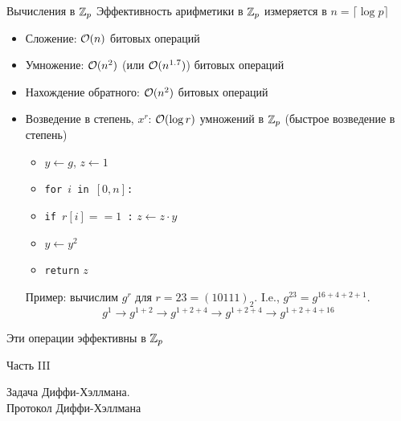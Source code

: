 \documentclass[usenames,dvipsnames,8pt,aspectratio=169]{beamer}
\begin{document}
\begin{frame}{Вычисления в ${{\mathbb Z}}_p$ }
\large
Эффективность арифметики в ${{\mathbb Z}}_p$ измеряется в $n = \lceil \log p \rceil$
\begin{itemize}
\itemsep 5pt
\item Сложение: $\mathcal{O}(n)$ битовых операций
\item Умножение: $\mathcal{O}(n^2)$ (или $\mathcal{O}(n^{1.7})$) битовых операций
\item Нахождение обратного: $\mathcal{O}(n^2)$ битовых операций
\pause
\item Возведение в степень, $x^r$:  $\mathcal{O}(\log r)$ умножений в ${{\mathbb Z}}_p$ (быстрое возведение в степень)\\
\begin{itemize}
\Large
\item $y \leftarrow g$, $z \leftarrow 1$
\item \texttt{for $i$ in $[0, n]$:}
\item \hspace{10pt}  \texttt{if $r[i]==1$ :} $z \leftarrow z \cdot y$
\item \hspace{10pt}  $y \leftarrow y^2$
\item \texttt{return} $z$
\end{itemize}
\pause 
Пример: вычислим $g^r$ для $r = 23 = (10111)_2$. I.e., $g^{23} = g^{16+4+2+1}$. \\
\[
g^1 \rightarrow g^{1+2} \rightarrow g^{1+2+4} \rightarrow  g^{1+2+4} \rightarrow g^{1+2+4+16} 
\]

\end{itemize}

\vspace{15pt}
\centering
\Large
Эти операции {\color{Orange} {эффективны}} в ${{\mathbb Z}}_p$
\end{frame}

\begin{frame}
Часть III \\ [10pt]
\begin{LARGE}
	
	\color{Orange}
	\Huge  Задача Диффи-Хэллмана. \\ Протокол Диффи-Хэллмана
	
\end{LARGE}
\end{frame}
\end{document}
